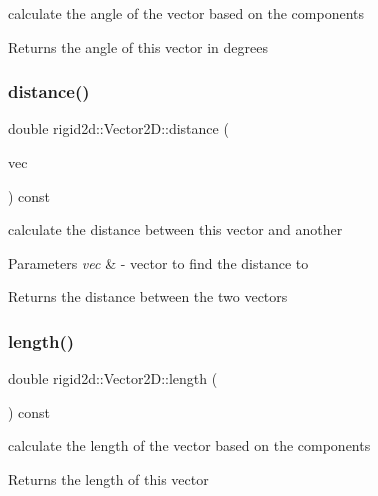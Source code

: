 calculate the angle of the vector based on the components 

\begin{DoxyReturn}{Returns}
the angle of this vector in degrees 
\end{DoxyReturn}
\mbox{\label{structrigid2d_1_1Vector2D_a929393171d0ac3cc0a3f438d9a2c9cf1}} 
\subsubsection{\texorpdfstring{distance()}{distance()}}
{\footnotesize\ttfamily double rigid2d\+::\+Vector2\+D\+::distance (\begin{DoxyParamCaption}\item[{\hyperlink{structrigid2d_1_1Vector2D}{Vector2D}}]{vec }\end{DoxyParamCaption}) const}



calculate the distance between this vector and another 


\begin{DoxyParams}{Parameters}
{\em vec} & -\/ vector to find the distance to \\
\hline
\end{DoxyParams}
\begin{DoxyReturn}{Returns}
the distance between the two vectors 
\end{DoxyReturn}
\mbox{\label{structrigid2d_1_1Vector2D_afe2117dc061b3f09c890ac13dd59c345}} 
\subsubsection{\texorpdfstring{length()}{length()}}
{\footnotesize\ttfamily double rigid2d\+::\+Vector2\+D\+::length (\begin{DoxyParamCaption}{ }\end{DoxyParamCaption}) const}



calculate the length of the vector based on the components 

\begin{DoxyReturn}{Returns}
the length of this vector 
\end{DoxyReturn}
\mbox{\label{structrigid2d_1_1Vector2D_a6534f1075f8f3338261331c954b449b2}} 
